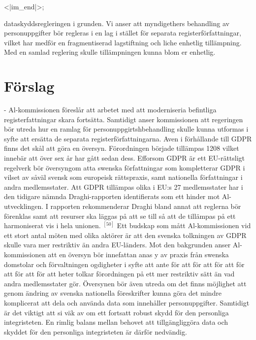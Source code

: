 {{{{{{{{{{<|im_end|>};

\begin{abstract}
Aven I förhållande till GDPR finns det åkål att göra en översyn. Förordningen började tillämpas 2018 vilket innebär att över sex år har gått sedan dess. Foto: Shutterstock
\end{abstract}
dataskyddsregleringen i grunden. Vi anser att myndigethers behandling av personuppgifter bör regleras i en lag i stället för separata registerförfattningar, vilket har medför en fragmentiserad lagstiftning och liche enhetlig tillämpning. Med en samlad reglering skulle tillämpningen kunna blom er enhetlig.
\section*{Förslag}
- Al-kommissionen föreslår att arbetet med att moderniseria befintliga registerfattningar skara fortsätta. Samtidigt anser kommissionen att regeringen bör utreda hur en ramlag för personuppgirtshbehandling skulle kunna utformas i syfte att ersätta de separata registerförfattningarna.
Aven i förhållande till GDPR finns det skål att göra en översyn. Förordningen började tillämpas 1208 vilket innebär att över sex år har gått sedan dess. Efforsom GDPR är ett EU-rättsligt regelverk bör översyngom atta swenska författningar som kompletterar GDPR i vilset av såväl svensk som europeisk rättspraxis, samt nationella författningar i andra medlemsstater. Att GDPR tillämpas olika i EU:s 27 medlemsstater har i den tidigare nämnda Draghi-rapporten identifierats som ett hinder mot Al-utvecklingen. I rapporten rekommenderar Draghi bland annat att reglerna bör förenklas samt att resurser ska läggas på att se till så att de tillämpas på ett harmoniserat vis i hela unionen. \({ }^{[50]}\) Ett budskap som mått Al-kommissionen vid ett stort antal möten med olika aktörer är att den svenska tolkningen av GDPR skulle vara mer restriktiv än andra EU-länders.
Mot den bakgrunden anser Al-kommissionen att en översyn bör innefattan anas y av praxis från swenska domstolar och förvaltningen ogdigheter i syfte att ante för att för att för att för att för att för att heter tolkar förordningen på ett mer restriktiv sätt än vad andra medlemsstater gör. Översynen bör även utreda om det finns möjlighet att genom ändring av svenska nationella föreskrifter kunna göra det mindre komplicerat att dela och använda data som innehåller personuppgifter. Samtidigt är det viktigt att si väk av om ett fortsatt robust skydd för den personliga integristeten. En rimlig balans mellan behovet att tillgängliggöra data och skyddet för den personliga integristeten är därför nedvändig.

}}}}}}}}}
